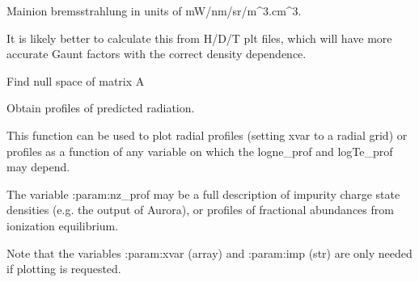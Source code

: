 \documentclass[letterpaper,10pt,english]{sphinxmanual}
\begin{document}

\begin{fulllineitems}
\label{\detokenize{aurora:aurora.atomic.main_ion_brems}}
Main\sphinxhyphen{}ion bremsstrahlung in units of  mW/nm/sr/m\textasciicircum{}3.cm\textasciicircum{}3.

It is likely better to calculate this from H/D/T plt files, which will have more accurate 
Gaunt factors with the correct density dependence.

\end{fulllineitems}


\begin{fulllineitems}
\label{\detokenize{aurora:aurora.atomic.null_space}}
Find null space of matrix A

\end{fulllineitems}


\begin{fulllineitems}
\label{\detokenize{aurora:aurora.atomic.plot_radiation_profs}}
Obtain profiles of predicted radiation.

This function can be used to plot radial profiles (setting xvar to a radial grid)
or profiles as a function of any variable on which the logne\_prof and logTe\_prof
may depend.

The variable :param:nz\_prof may be a full description of impurity charge state densities
(e.g. the output of Aurora), or profiles of fractional abundances from ionization
equilibrium.

Note that the variables :param:xvar (array) and :param:imp (str) are only needed if plotting is requested.

\end{fulllineitems}
\end{document}
